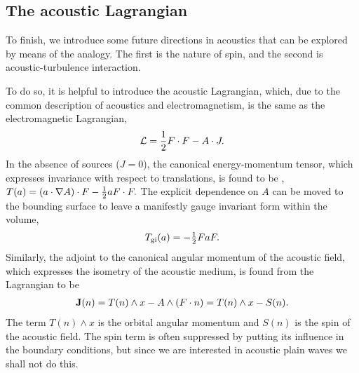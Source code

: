 \subsection{The acoustic Lagrangian}\label{sec:lagrangian}
To finish, we introduce some future directions in acoustics that can be explored by means of the analogy.
The first  is  the nature of spin,
and the second is acoustic-turbulence interaction.

To do so, it is helpful to introduce the acoustic Lagrangian,
which, due to the common description of acoustics and electromagnetism,
is the same as the electromagnetic Lagrangian, 
\begin{align}
  {\cal L} = \frac{1}{2} F \cdot F  - A \cdot J.
\end{align}
In the absence of sources ($J = 0$),
the canonical energy-momentum tensor, which expresses invariance with respect to translations,
is found to be \cite{Lasenby1993, Doran2003},  $T(a) = \left( a\cdot \nabla A \right)\cdot F - \tfrac{1}{2} a F \cdot F.$
The explicit dependence on $A$ can be moved to the bounding surface \cite{Lasenby1993}
to leave a manifestly gauge invariant form within the volume,
\begin{align}
\label{eqn:TAEM}
  T_{\textrm{gi}}(a) = -\tfrac{1}{2} F a F.
\end{align}
Similarly, the  adjoint to the canonical angular momentum of the acoustic field, which expresses the isometry of the acoustic medium, 
is found from the Lagrangian to be \cite{Lasenby1993}
\begin{align}
  \label{eqn:AM}
  \mathbf{J}(n) = T(n) \wedge x - A \wedge \left( F\cdot n \right) = T(n) \wedge x - S(n).
\end{align}
The term $T(n) \wedge x$ is the  orbital angular momentum and $S(n)$ is the spin of the acoustic field.
The spin term is often suppressed by putting its influence in the boundary conditions,
but since we are interested in acoustic plain waves we shall not do this.


